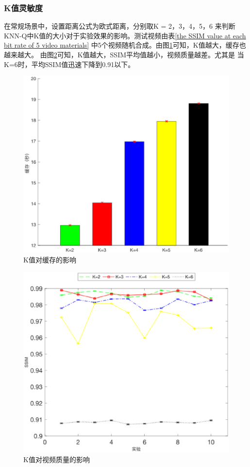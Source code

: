 \documentclass[twocolumn]{article}
\begin{document}
\subsubsection{K值灵敏度}
在常规场景中，设置距离公式为欧式距离，分别取K = 2，3，4，5，6
来判断KNN-Q中K值的大小对于实验效果的影响。测试视频由表\ref{the SSIM value at each bit rate of 5 video materials}
中5个视频随机合成。由图\ref{k_sensitivity_buffer}可知，K值越大，缓存也越来越大。
由图\ref{k_sensitivity_ssim}可知，K值越大，SSIM平均值越小，视频质量越差。尤其是
当K=6时，平均SSIM值迅速下降到0.91以下。
\begin{figure}[htbp]
\centering
\includegraphics[width=\columnwidth]{k_sensitivity_buffer}
\caption{K值对缓存的影响}
\label{k_sensitivity_buffer}
\end{figure}
\begin{figure}[htbp]
\centering
\includegraphics[width=\columnwidth]{k_sensitivity_ssim}
\caption{K值对视频质量的影响}
\label{k_sensitivity_ssim}
\end{figure}
\end{document}
